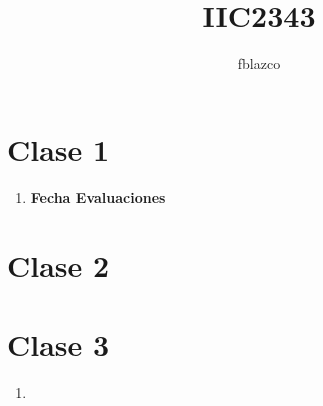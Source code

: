 \documentclass{article}
\author{fblazco}
\title{IIC2343}
\begin{document}
	\maketitle
    \section{Clase 1}
    \begin{enumerate}
        \item \textbf{Fecha Evaluaciones}
    \end{enumerate}    
    \section{Clase 2}
    \section{Clase 3}
    \begin{enumerate}
        \item 
    \end{enumerate}
        
\end{document}
